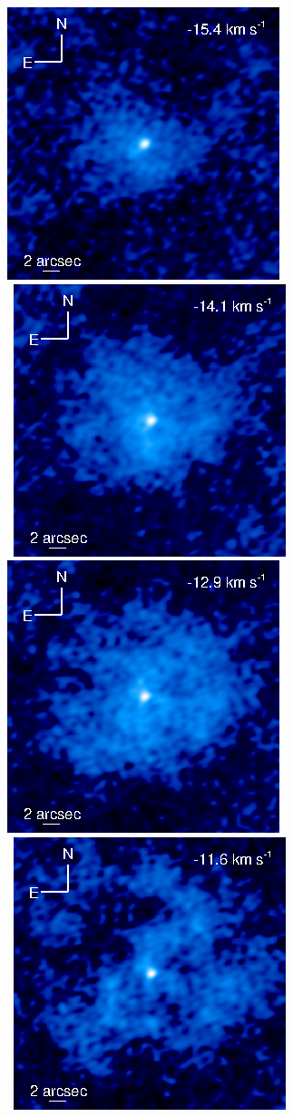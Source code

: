 \documentclass[manuscript]{aastex}
\begin{document}
\begin{figure}[hbt!]
{          \includegraphics[]{f5.eps}
          }
\\
\mbox{
          \includegraphics[]{f6.eps}
          \includegraphics[]{f7.eps}
         }
\\
\mbox{
          \includegraphics[]{f8.eps}
}
\end{figure}
\end{document}
